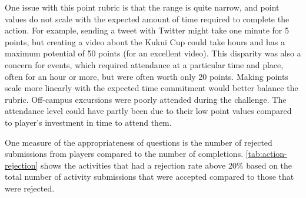 One issue with this point rubric is that the range is quite narrow, and point values do not scale with the expected amount of time required to complete the action. For example, sending a tweet with Twitter might take one minute for 5 points, but creating a video about the Kukui Cup could take hours and has a maximum potential of 50 points (for an excellent video). This disparity was also a concern for events, which required attendance at a particular time and place, often for an hour or more, but were often worth only 20 points. Making points scale more linearly with the expected time commitment would better balance the rubric. Off-campus excursions were poorly attended during the challenge. The attendance level could have partly been due to their low point values compared to player's investment in time to attend them.

One measure of the appropriateness of questions is the number of rejected submissions from players compared to the number of completions. \autoref{tab:action-rejection} shows the activities that had a rejection rate above 20\% based on the total number of activity submissions that were accepted compared to those that were rejected.

